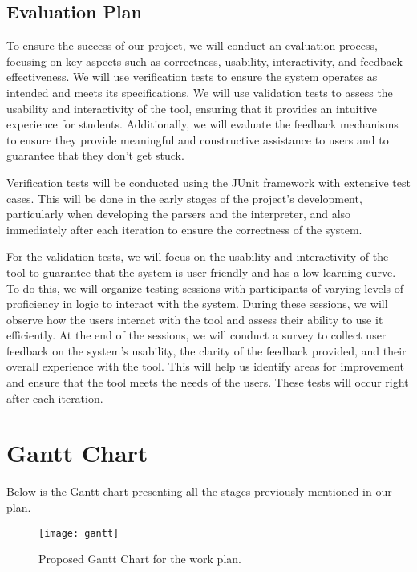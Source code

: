 \subsection{Evaluation Plan}
To ensure the success of our project, we will conduct an evaluation process, focusing on key aspects such as correctness, usability, interactivity, and feedback effectiveness. We will use verification tests to ensure the system operates as intended and meets its specifications. We will use validation tests to assess the usability and interactivity of the tool, ensuring that it provides an intuitive experience for students. Additionally, we will evaluate the feedback mechanisms to ensure they provide meaningful and constructive assistance to users and to guarantee that they don't get stuck.

Verification tests will be conducted using the JUnit framework with extensive test cases. This will be done in the early stages of the project’s development, particularly when developing the parsers and the interpreter, and also immediately after each iteration to ensure the correctness of the system.

For the validation tests, we will focus on the usability and interactivity of the tool to guarantee that the system is user-friendly and has a low learning curve. To do this, we will organize testing sessions with participants of varying levels of proficiency in logic to interact with the system. During these sessions, we will observe how the users interact with the tool and assess their ability to use it efficiently. At the end of the sessions, we will conduct a survey to collect user feedback on the system’s usability, the clarity of the feedback provided, and their overall experience with the tool. This will help us identify areas for improvement and ensure that the tool meets the needs of the users. These tests will occur right after each iteration.


\section{Gantt Chart}
Below is the Gantt chart presenting all the stages previously mentioned in our plan.
\begin{figure}[htbp]
    \centering
    \texttt{[image: gantt]}
    \caption{Proposed Gantt Chart for the work plan.}
    \label{img:gantt}
\end{figure}